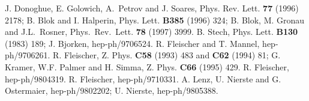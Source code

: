 \begin{thebibliography}{999}
J. Donoghue, E. Golowich, A.~Petrov and J. Soares, 
{ Phys. Rev. Lett.} {\bf 77} (1996) 2178; 
B. Blok and I. Halperin, { Phys. Lett.} {\bf B385} (1996) 324; 
B. Blok, M. Gronau and J.L.~Rosner,
{ Phys.\ Rev.\ Lett.} {\bf 78} (1997) 3999.
B. Stech, { Phys. Lett.} {\bf B130} (1983) 189; 
J. Bjorken, hep-ph/9706524.
R. Fleischer and T. Mannel, hep-ph/9706261.
R. Fleischer, Z. Phys. {\bf C58} (1993) 483 and 
{\bf C62} (1994) 81; G. Kramer, W.F. Palmer and H. Simma,
 Z. Phys. {\bf C66} (1995) 429.
R. Fleischer, hep-ph/9804319.
R. Fleischer, hep-ph/9710331.
A. Lenz, U. Nierste and G. Ostermaier, hep-ph/9802202; 
U. Nierste, hep-ph/9805388.
\end{thebibliography}



